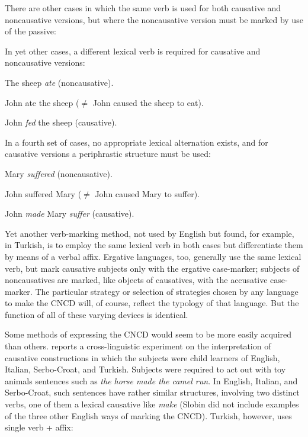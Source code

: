 There are other cases in which the same verb is used for both causative and noncausative versions, but where the noncausative version must be marked by use of the passive:

\z


\z

\z

In yet other cases, a different lexical verb is required for causative and noncausative versions:

\ea\label{ex:3:70}
 The sheep \textit{ate} (noncausative).
\z

\ea\label{ex:3:71}
 John ate the sheep ($\neq$ John caused the sheep to eat).
\z

\ea\label{ex:3:72}
 John \textit{fed} the sheep (causative). 
\z

In a fourth set of cases, no appropriate lexical alternation exists, and for causative versions a periphrastic structure must be used:

\ea\label{ex:3:73}
 Mary \textit{suffered} (noncausative).
\z

\ea\label{ex:3:74}
John suffered Mary ($\neq$ John caused Mary to suffer).
\z

\ea\label{ex:3:75}
 John \textit{made} Mary \textit{suffer} (causative). 
\z

Yet another verb-marking method, not used by English but found, for example, in Turkish, is to employ the same lexical verb in both cases but differentiate them by means of a verbal affix. Ergative languages, too, generally use the same lexical verb, but mark causative subjects only with the ergative case-marker; subjects of noncausatives are marked, like objects of causatives, with the accusative case-marker. The particular strategy or selection of strategies chosen by any language to make the CNCD will, of course, reflect the typology of that language. But the function of all of these varying devices is identical.

Some methods of expressing the CNCD would seem to be more easily acquired than others. \citet{Slobin1978} reports a cross-linguistic experiment on the interpretation of causative constructions in which the subjects were child learners of English, Italian, Serbo-Croat, and Turkish. Subjects were required to act out with toy animals sentences such as \textit{the horse made the camel run}. In English, Italian, and Serbo-Croat, such sentences have rather similar structures, involving two distinct verbs, one of them a lexical causative like \textit{make} (Slobin did not
include examples of the three other English ways of marking the CNCD). Turkish, however, uses single verb + affix:

